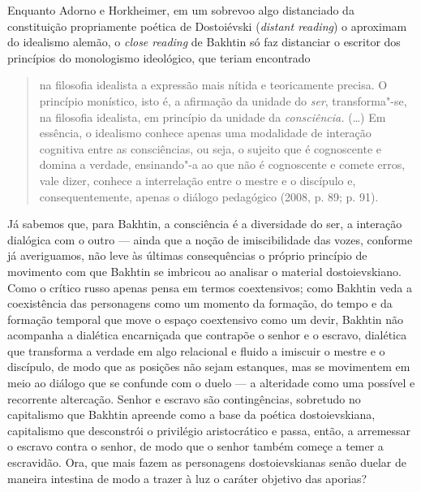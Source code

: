 Enquanto Adorno e Horkheimer, em um sobrevoo algo distanciado da
constituição propriamente poética de Dostoiévski (\emph{distant
reading}) o aproximam do idealismo alemão, o \emph{close reading} de
Bakhtin só faz distanciar o escritor dos princípios do monologismo
ideológico, que teriam encontrado

\begin{quote}
na filosofia idealista a expressão mais nítida e teoricamente precisa. O
princípio monístico, isto é, a afirmação da unidade do \emph{ser},
transforma"-se, na filosofia idealista, em princípio da unidade da
\emph{consciência.} (\ldots) Em essência, o idealismo conhece apenas uma
modalidade de interação cognitiva entre as consciências, ou seja, o
sujeito que é cognoscente e domina a verdade, ensinando"-a ao que não é
cognoscente e comete erros, vale dizer, conhece a interrelação entre o
mestre e o discípulo e, consequentemente, apenas o diálogo pedagógico
(2008, p. 89; p. 91).
\end{quote}

Já sabemos que, para Bakhtin, a consciência é a diversidade do ser, a
interação dialógica com o outro --- ainda que a noção de imiscibilidade
das vozes, conforme já averiguamos, não leve às últimas consequências o
próprio princípio de movimento com que Bakhtin se imbricou ao analisar o
material dostoievskiano. Como o crítico russo apenas pensa em termos
coextensivos; como Bakhtin veda a coexistência das personagens como um
momento da formação, do tempo e da formação temporal que move o espaço
coextensivo como um devir, Bakhtin não acompanha a dialética encarniçada
que contrapõe o senhor e o escravo, dialética que transforma a verdade
em algo relacional e fluido a imiscuir o mestre e o discípulo, de modo
que as posições não sejam estanques, mas se movimentem em meio ao
diálogo que se confunde com o duelo --- a alteridade como uma possível e
recorrente altercação. Senhor e escravo são contingências, sobretudo no
capitalismo que Bakhtin apreende como a base da poética dostoievskiana,
capitalismo que desconstrói o privilégio aristocrático e passa, então, a
arremessar o escravo contra o senhor, de modo que o senhor também começe
a temer a escravidão. Ora, que mais fazem as personagens dostoievskianas
senão duelar de maneira intestina de modo a trazer à luz o caráter
objetivo das aporias?

